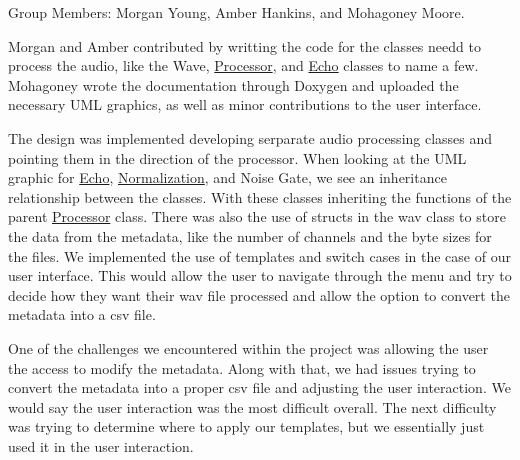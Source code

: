 
\begin{DoxyEnumerate}
\item Group Members\+: Morgan Young, Amber Hankins, and Mohagoney Moore.
\item Morgan and Amber contributed by writting the code for the classes needd to process the audio, like the Wave, \hyperlink{classProcessor}{Processor}, and \hyperlink{classEcho}{Echo} classes to name a few. Mohagoney wrote the documentation through Doxygen and uploaded the necessary U\+ML graphics, as well as minor contributions to the user interface.
\item The design was implemented developing serparate audio processing classes and pointing them in the direction of the processor. When looking at the U\+ML graphic for \hyperlink{classEcho}{Echo}, \hyperlink{classNormalization}{Normalization}, and Noise Gate, we see an inheritance relationship between the classes. With these classes inheriting the functions of the parent \hyperlink{classProcessor}{Processor} class. There was also the use of structs in the wav class to store the data from the metadata, like the number of channels and the byte sizes for the files. We implemented the use of templates and switch cases in the case of our user interface. This would allow the user to navigate through the menu and try to decide how they want their wav file processed and allow the option to convert the metadata into a csv file.
\item One of the challenges we encountered within the project was allowing the user the access to modify the metadata. Along with that, we had issues trying to convert the metadata into a proper csv file and adjusting the user interaction. We would say the user interaction was the most difficult overall. The next difficulty was trying to determine where to apply our templates, but we essentially just used it in the user interaction. 
\end{DoxyEnumerate}
